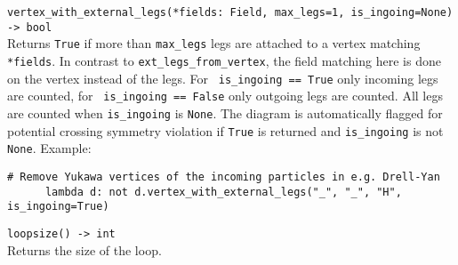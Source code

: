\begin{basedescript}{\desclabelstyle{\pushlabel}}
   \item[\hspace{-1em}]\colorbox{gray!30}{\lstinline[style=pykw]{vertex_with_external_legs(*fields: Field, max_legs=1, is_ingoing=None) -> bool}} \vspace{0.1cm}\\
   Returns \texttt{True} if more than \texttt{max\_legs} legs are attached to a vertex matching \texttt{*fields}. In contrast to \texttt{ext\_legs\_from\_vertex}, the field matching here is done on the vertex instead of the legs. For \lstinline[style=pykw]| is_ingoing == True| only incoming legs are counted, for \lstinline[style=pykw]| is_ingoing == False| only outgoing legs are counted. All legs are counted when \texttt{is\_ingoing} is \texttt{None}. The diagram is automatically flagged for potential crossing symmetry violation if \texttt{True} is returned and \texttt{is\_ingoing} is not \texttt{None}.
   Example:
   \begin{lstlisting}[style=pykw]
      # Remove Yukawa vertices of the incoming particles in e.g. Drell-Yan
      lambda d: not d.vertex_with_external_legs("_", "_", "H", is_ingoing=True)
   \end{lstlisting}

   \item[\hspace{-1em}]\colorbox{gray!30}{\lstinline[style=pykw]|loopsize() -> int|} \vspace{0.1cm}\\
   Returns the size of the loop.
\end{basedescript}
